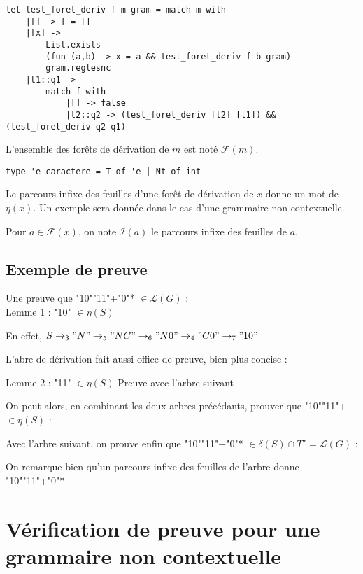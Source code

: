 \documentclass[a4paper,10pt]{article}
\begin{document}
\begin{verbatim}
let test_foret_deriv f m gram = match m with
    |[] -> f = []
    |[x] -> 
        List.exists 
        (fun (a,b) -> x = a && test_foret_deriv f b gram) 
        gram.reglesnc
    |t1::q1 -> 
        match f with
            |[] -> false
            |t2::q2 -> (test_foret_deriv [t2] [t1]) && (test_foret_deriv q2 q1)
\end{verbatim}


L'ensemble des forêts de dérivation de $m$ est noté $\mathcal{F}(m)$.

\begin{verbatim}
type 'e caractere = T of 'e | Nt of int
\end{verbatim}

Le parcours infixe des feuilles d'une forêt de dérivation de $x$ donne un mot de $\eta(x)$.
Un exemple sera donnée dans le cas d'une grammaire non contextuelle.

Pour $a \in \mathcal{F}(x)$, on note $\mathcal{I}(a)$ le parcours infixe des feuilles de $a$. 

\subsection{Exemple de preuve}

Une preuve que "10""11"+"0"* $\in \mathcal{L}(G)$ :\\
Lemme 1 : "10" $\in \eta(S)$

    En effet, $S\rightarrow_3 "N" \rightarrow_5 "NC" \rightarrow_6 "N0" \rightarrow_4 "C0" \rightarrow_7 "10"$


L'abre de dérivation fait aussi office de preuve, bien plus concise :
   

Lemme 2 : "11" $\in \eta(S)$
Preuve avec l'arbre suivant
 

On peut alors, en combinant les deux arbres précédants, prouver que "10""11"+ $\in \eta(S)$ :
 

Avec l'arbre suivant, on prouve enfin que "10""11"+"0"* $\in \delta(S) \cap T^\star = \mathcal{L}(G)$ :
 

On remarque bien qu'un parcours infixe des feuilles de l'arbre donne "10""11"+"0"*

\section{Vérification de preuve pour une grammaire non contextuelle}
\end{document}
